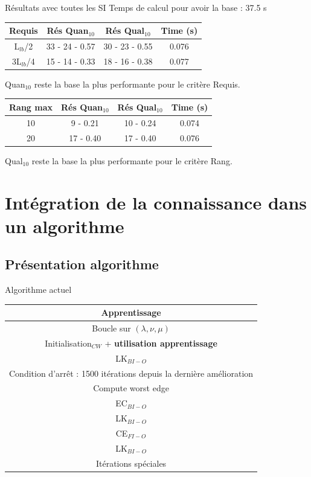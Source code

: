 \documentclass{beamer}
\begin{document}
\begin{frame}{Résultats avec toutes les SI}
Temps de calcul pour avoir la base : 37.5 s

\centering
\begin{tabular}{|c|c|c|c|}
   \hline
   Requis & Rés Quan$_{10}$ & Rés Qual$_{10}$ & Time (s)\\
   \hline
   L$_{lb}$/2 & 33 - 24 - 0.57 & 30 - 23 - 0.55 & 0.076 \\
   \hline
   3L$_{lb}$/4 & 15 - 14 - 0.33 & 18 - 16 - 0.38  & 0.077 \\
   \hline
\end{tabular}

Quan$_{10}$ reste la base la plus performante pour le critère Requis.

\begin{tabular}{|c|c|c|c|}
   \hline
   Rang max & Rés Quan$_{10}$ & Rés Qual$_{10}$ & Time (s)\\
   \hline
   10 & 9 - 0.21 & 10 - 0.24 & 0.074 \\
   \hline
   20 & 17 - 0.40 & 17 - 0.40 & 0.076 \\
   \hline
\end{tabular}

Qual$_{10}$ reste la base la plus performante pour le critère Rang.
\end{frame}

\section{Intégration de la connaissance dans un algorithme}

\subsection{Présentation algorithme}
\begin{frame}{Algorithme actuel}

\begin{center}
\begin{tabular}{|c|}
	\hline
 	\textbf{Apprentissage} \\
   \hline
   Boucle sur $(\lambda, \nu, \mu)$ \\
   \hline
   \hline
   Initialisation$_{CW}$ + \textbf{utilisation apprentissage} \\
   \hline
   LK$_{BI-O}$ \\
   \hline
   \hline
   Condition d'arrêt : 1500 itérations depuis la dernière amélioration  \\
   \hline
   Compute worst edge \\
   \hline
   EC$_{BI-O}$ \\
   \hline
   LK$_{BI-O}$ \\
   \hline
   CE$_{FI-O}$ \\
   \hline
   LK$_{BI-O}$ \\
   \hline
   Itérations spéciales \\
   \hline
   \hline

\end{tabular}
\end{center}
\end{frame}
\end{document}
